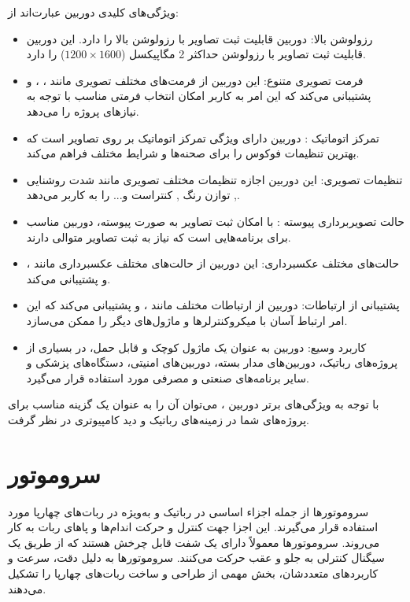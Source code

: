 ویژگی‌های کلیدی دوربین  عبارت‌اند از:
\begin{itemize}
	\item
	رزولوشن بالا: دوربین  قابلیت ثبت تصاویر با رزولوشن بالا را دارد. این دوربین قابلیت ثبت تصاویر با رزولوشن حداکثر 2 مگاپیکسل ($1200 \times 1600$) را دارد.
	
	\item
	فرمت تصویری متنوع: این دوربین از فرمت‌های مختلف تصویری مانند  ،  ،  و   پشتیبانی می‌کند که این امر به کاربر امکان انتخاب فرمتی مناسب با توجه به نیازهای پروژه را می‌دهد.
	\item
	تمرکز اتوماتیک : دوربین  دارای ویژگی تمرکز اتوماتیک بر روی تصاویر است که بهترین تنظیمات فوکوس را برای صحنه‌ها و شرایط مختلف فراهم می‌کند.
	\item
	تنظیمات تصویری: این دوربین اجازه تنظیمات مختلف تصویری مانند شدت روشنایی , توازن رنگ , کنتراست  و... را به کاربر می‌دهد.
	\item
	حالت تصویربرداری پیوسته : با امکان ثبت تصاویر به صورت پیوسته، دوربین  مناسب برای برنامه‌هایی است که نیاز به ثبت تصاویر متوالی دارند.
	\item
	حالت‌های مختلف عکسبرداری: این دوربین از حالت‌های مختلف عکسبرداری مانند ،  و  پشتیبانی می‌کند.
	\item
	پشتیبانی از ارتباطات: دوربین  از ارتباطات مختلف مانند  ،  و  پشتیبانی می‌کند که این امر ارتباط آسان با میکروکنترلرها و ماژول‌های دیگر را ممکن می‌سازد.
	\item
	کاربرد وسیع: دوربین  به عنوان یک ماژول کوچک و قابل حمل، در بسیاری از پروژه‌های رباتیک، دوربین‌های مدار بسته، دوربین‌های امنیتی، دستگاه‌های پزشکی و سایر برنامه‌های صنعتی و مصرفی مورد استفاده قرار می‌گیرد.
\end{itemize}
با توجه به ویژگی‌های برتر دوربین ، می‌توان آن را به عنوان یک گزینه مناسب برای پروژه‌های شما در زمینه‌های رباتیک و دید کامپیوتری در نظر گرفت.

\section{سروموتور}
سروموتورها از جمله اجزاء اساسی در رباتیک و به‌ویژه در ربات‌های چهارپا مورد استفاده قرار می‌گیرند. این اجزا جهت کنترل و حرکت اندام‌ها و پاهای ربات به کار می‌روند. سروموتورها معمولاً دارای یک شفت قابل چرخش هستند که از طریق یک سیگنال کنترلی به جلو و عقب حرکت می‌کنند. سروموتورها به دلیل دقت، سرعت و کاربرد‌های متعددشان، بخش مهمی از طراحی و ساخت ربات‌های چهارپا را تشکیل می‌دهند.

